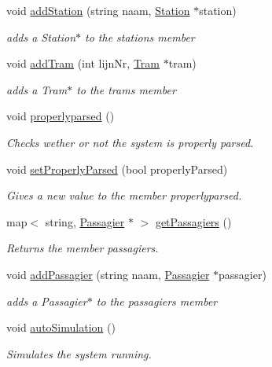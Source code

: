 \begin{DoxyCompactItemize}
void \hyperlink{classSystem_a8d73a59e5ca0c23cc36d3bf4b7ac902d}{add\+Station} (string naam, \hyperlink{classStation}{Station} $\ast$station)
\begin{DoxyCompactList}\small\item\em adds a Station$\ast$ to the stations member \end{DoxyCompactList}\item 
void \hyperlink{classSystem_a9c6d16ae38e21499491a7059d67f9284}{add\+Tram} (int lijn\+Nr, \hyperlink{classTram}{Tram} $\ast$tram)
\begin{DoxyCompactList}\small\item\em adds a Tram$\ast$ to the trams member \end{DoxyCompactList}\item 
void \hyperlink{classSystem_a8060d45e6030ee1ad01a11a990bdd1ad}{properlyparsed} ()\hypertarget{classSystem_a8060d45e6030ee1ad01a11a990bdd1ad}{}\label{classSystem_a8060d45e6030ee1ad01a11a990bdd1ad}

\begin{DoxyCompactList}\small\item\em Checks wether or not the system is properly parsed. \end{DoxyCompactList}\item 
void \hyperlink{classSystem_af140010428a79ddde06f3546e7737d86}{set\+Properly\+Parsed} (bool properly\+Parsed)
\begin{DoxyCompactList}\small\item\em Gives a new value to the member properlyparsed. \end{DoxyCompactList}\item 
map$<$ string, \hyperlink{classPassagier}{Passagier} $\ast$ $>$ \hyperlink{classSystem_a25bf1c319312604ce89890fa827f4552}{get\+Passagiers} ()
\begin{DoxyCompactList}\small\item\em Returns the member passagiers. \end{DoxyCompactList}\item 
void \hyperlink{classSystem_ad2a3016a3d4cf9273cf8156f4fc69dfb}{add\+Passagier} (string naam, \hyperlink{classPassagier}{Passagier} $\ast$passagier)
\begin{DoxyCompactList}\small\item\em adds a Passagier$\ast$ to the passagiers member \end{DoxyCompactList}\item 
void \hyperlink{classSystem_ae392bbed93678914f3b0aff18c4a6d4d}{auto\+Simulation} ()
\begin{DoxyCompactList}\small\item\em Simulates the system running. \end{DoxyCompactList}\end{DoxyCompactItemize}


